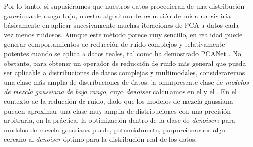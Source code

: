 \documentclass[../../book-main.tex]{subfiles}
\begin{document}
Por lo tanto, si supusiéramos que nuestros datos procedieran de una distribución gaussiana de rango bajo,
nuestro algoritmo de reducción de ruido consistiría básicamente en aplicar sucesivamente
muchas iteraciones de PCA a datos cada vez menos ruidosos.
Aunque este método parece muy sencillo, en realidad puede generar comportamientos de reducción de ruido complejos
y relativamente potentes cuando se aplica a datos reales,
tal como ha demostrado PCANet \parencite{chan2015pcanet}.
No obstante, para obtener un operador de reducción de ruido más general
que pueda ser aplicable a distribuciones de datos complejas y multimodales,
consideraremos una clase más amplia de distribuciones de datos: la omnipresente
clase de \textit{modelos de mezcla gaussiana de bajo rango}, cuyo \textit{denoiser}
calculamos en el  y el
. En el contexto de la
reducción de ruido, dado que los modelos de mezcla gaussiana pueden aproximar una clase muy amplia
de distribuciones con una precisión arbitraria, en la práctica, la optimización dentro de
la clase de \textit{denoisers} para modelos de mezcla gaussiana puede, potencialmente,
proporcionarnos algo cercano al \textit{denoiser} óptimo para la distribución real de los datos.
\end{document}
